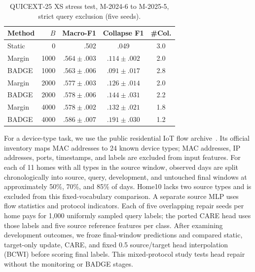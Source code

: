 \documentclass[journal]{IEEEtran}
\newcommand{\ours}{CARE}
\begin{document}
\begin{table}[!t]
\centering
\caption{QUICEXT-25 XS stress test, M-2024-6 to M-2025-5, strict query exclusion (five seeds).}
\label{tab:quic}
\scriptsize
\setlength{\tabcolsep}{3pt}
\begin{tabular}{@{}lrrcc@{}}
\toprule
Method & $B$ & Macro-F1 & Collapse F1 & \#Col.\\
\midrule
Static & 0 & .502 & .049 & 3.0\\
Margin & 1000 & $.564\pm.003$ & $.114\pm.002$ & 2.0\\
BADGE & 1000 & $.563\pm.006$ & $.091\pm.017$ & 2.8\\
Margin & 2000 & $.577\pm.003$ & $.126\pm.014$ & 2.0\\
BADGE & 2000 & $.578\pm.006$ & $.144\pm.031$ & 2.2\\
Margin & 4000 & $.578\pm.002$ & $.132\pm.021$ & 1.8\\
BADGE & 4000 & $.586\pm.007$ & $.191\pm.030$ & 1.2\\
\bottomrule
\end{tabular}
\end{table}

For a device-type task, we use the public residential IoT flow archive~\cite{pashamokhtari2023dynamic}. Its official inventory maps MAC addresses to 24 known device types; MAC addresses, IP addresses, ports, timestamps, and labels are excluded from input features. For each of 11 homes with all types in the source window, observed days are split chronologically into source, query, development, and untouched final windows at approximately 50\%, 70\%, and 85\% of days. Home10 lacks two source types and is excluded from this fixed-vocabulary comparison. A separate source MLP uses flow statistics and protocol indicators. Each of five overlapping repair seeds per home pays for 1,000 uniformly sampled query labels; the ported \ours{} head uses those labels and five source reference features per class. After examining development outcomes, we froze final-window predictions and compared static, target-only update, \ours{}, and fixed 0.5 source/target head interpolation (BCWI) before scoring final labels. This mixed-protocol study tests head repair without the monitoring or BADGE stages.
\end{document}
